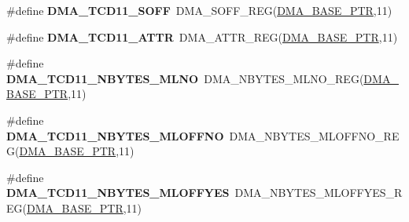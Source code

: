 \begin{DoxyCompactItemize}
\item 
\hypertarget{group___d_m_a___register___accessor___macros_ga75ede423859738cb80ae588f482043bb}{}\#define {\bfseries D\+M\+A\+\_\+\+T\+C\+D11\+\_\+\+S\+O\+F\+F}~D\+M\+A\+\_\+\+S\+O\+F\+F\+\_\+\+R\+E\+G(\hyperlink{group___d_m_a___peripheral_ga6997fbc1b1973e9f27170217a3bd6f22}{D\+M\+A\+\_\+\+B\+A\+S\+E\+\_\+\+P\+T\+R},11)\label{group___d_m_a___register___accessor___macros_ga75ede423859738cb80ae588f482043bb}

\item 
\hypertarget{group___d_m_a___register___accessor___macros_ga4350d724768dbdc84d993c564d3e0c4d}{}\#define {\bfseries D\+M\+A\+\_\+\+T\+C\+D11\+\_\+\+A\+T\+T\+R}~D\+M\+A\+\_\+\+A\+T\+T\+R\+\_\+\+R\+E\+G(\hyperlink{group___d_m_a___peripheral_ga6997fbc1b1973e9f27170217a3bd6f22}{D\+M\+A\+\_\+\+B\+A\+S\+E\+\_\+\+P\+T\+R},11)\label{group___d_m_a___register___accessor___macros_ga4350d724768dbdc84d993c564d3e0c4d}

\item 
\hypertarget{group___d_m_a___register___accessor___macros_ga31e90b84c561b0753b53a9c503e41757}{}\#define {\bfseries D\+M\+A\+\_\+\+T\+C\+D11\+\_\+\+N\+B\+Y\+T\+E\+S\+\_\+\+M\+L\+N\+O}~D\+M\+A\+\_\+\+N\+B\+Y\+T\+E\+S\+\_\+\+M\+L\+N\+O\+\_\+\+R\+E\+G(\hyperlink{group___d_m_a___peripheral_ga6997fbc1b1973e9f27170217a3bd6f22}{D\+M\+A\+\_\+\+B\+A\+S\+E\+\_\+\+P\+T\+R},11)\label{group___d_m_a___register___accessor___macros_ga31e90b84c561b0753b53a9c503e41757}

\item 
\hypertarget{group___d_m_a___register___accessor___macros_ga1e7eeff6c1ac1ce7329ce41ed9094618}{}\#define {\bfseries D\+M\+A\+\_\+\+T\+C\+D11\+\_\+\+N\+B\+Y\+T\+E\+S\+\_\+\+M\+L\+O\+F\+F\+N\+O}~D\+M\+A\+\_\+\+N\+B\+Y\+T\+E\+S\+\_\+\+M\+L\+O\+F\+F\+N\+O\+\_\+\+R\+E\+G(\hyperlink{group___d_m_a___peripheral_ga6997fbc1b1973e9f27170217a3bd6f22}{D\+M\+A\+\_\+\+B\+A\+S\+E\+\_\+\+P\+T\+R},11)\label{group___d_m_a___register___accessor___macros_ga1e7eeff6c1ac1ce7329ce41ed9094618}

\item 
\hypertarget{group___d_m_a___register___accessor___macros_ga5eb040bb89b2c7e0e133670971a228ef}{}\#define {\bfseries D\+M\+A\+\_\+\+T\+C\+D11\+\_\+\+N\+B\+Y\+T\+E\+S\+\_\+\+M\+L\+O\+F\+F\+Y\+E\+S}~D\+M\+A\+\_\+\+N\+B\+Y\+T\+E\+S\+\_\+\+M\+L\+O\+F\+F\+Y\+E\+S\+\_\+\+R\+E\+G(\hyperlink{group___d_m_a___peripheral_ga6997fbc1b1973e9f27170217a3bd6f22}{D\+M\+A\+\_\+\+B\+A\+S\+E\+\_\+\+P\+T\+R},11)\label{group___d_m_a___register___accessor___macros_ga5eb040bb89b2c7e0e133670971a228ef}


\end{DoxyCompactItemize}
